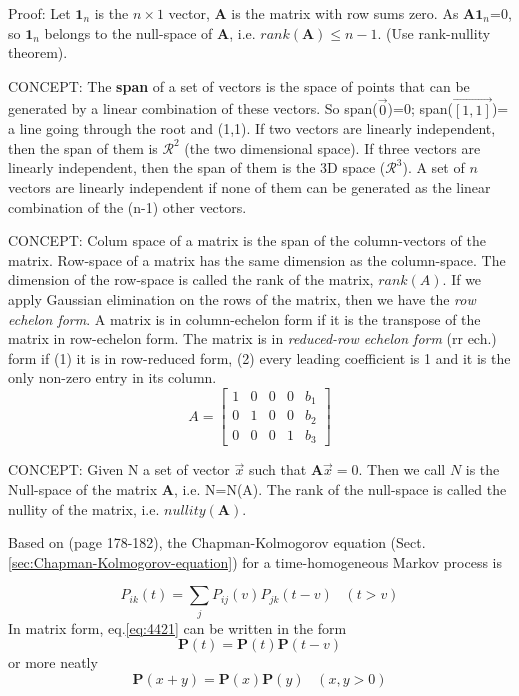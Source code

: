 \begin{framed}
Proof: Let $\mathbf{1}_n$ is the $n\times 1$ vector, $\mathbf{A}$ is the matrix
with row sums zero. As $\mathbf{A1}_n$=0, so $\mathbf{1}_n$ belongs to the
null-space of $\mathbf{A}$, i.e. $rank(\mathbf{A})\le n-1$. (Use rank-nullity
theorem).

CONCEPT: The {\bf span} of a set of vectors is the space of points that can be
generated by a linear combination of these vectors. So span($\vec{0}$)=0;
span($\vec{[1,1]}$)= a line going through the root and (1,1). If two vectors are
linearly independent, then the span of them is $\mathcal{R}^2$ (the two
dimensional space). If three vectors are linearly independent, then the span of
them is the 3D space ($\mathcal{R}^3$). A set of $n$ vectors are linearly
independent if none of them can be generated as the linear combination of the
(n-1) other vectors.

CONCEPT: Colum space of a matrix is the span of the column-vectors of the
matrix. Row-space of a matrix has the same dimension as the column-space. The
dimension of the row-space is called the rank of the matrix, $rank(A)$. If we
apply Gaussian elimination on the rows of the matrix, then we have the {\it row
echelon form}. A matrix is in column-echelon form if it is the transpose of the
matrix in row-echelon form. The matrix is in {\it reduced-row echelon form} (rr
ech.) form if (1) it is in row-reduced form, (2) every leading coefficient is 1
and it is the only non-zero entry in its column.
\begin{equation}
A = \left[ \begin{array}{ccccc}1 & 0 & 0 & 0 & b_1\\ 0 & 1 & 0 & 0 & b_2 \\ 0 &
0 & 0 & 1 & b_3 \end{array} \right]
\end{equation}

CONCEPT: Given N a set of vector $\vec{x}$ such that $\mathbf{A}\vec{x}=0$. Then
we call $N$ is the Null-space of the matrix $\mathbf{A}$, i.e. N=N(A). The rank
of the null-space is called the nullity of the matrix, i.e.
$nullity(\mathbf{A})$.
\end{framed}

Based on \citep{cox1965} (page 178-182), the Chapman-Kolmogorov equation
(Sect.\ref{sec:Chapman-Kolmogorov-equation}) for a time-homogeneous Markov
process is

\begin{equation}
\label{eq:4421}
P_{ik}(t) = \sum_{j} P_{ij}(v)P_{jk}(t-v)  \;\;\; (t>v)
\end{equation}
In matrix form, eq.\ref{eq:4421} can be written in the form
\begin{equation}
\mathbf{P}(t) = \mathbf{P}(t)\mathbf{P}(t-v)
\end{equation}
or more neatly
\begin{equation}
\mathbf{P}(x+y) = \mathbf{P}(x)\mathbf{P}(y)  \;\;\; (x,y>0)
\end{equation}

